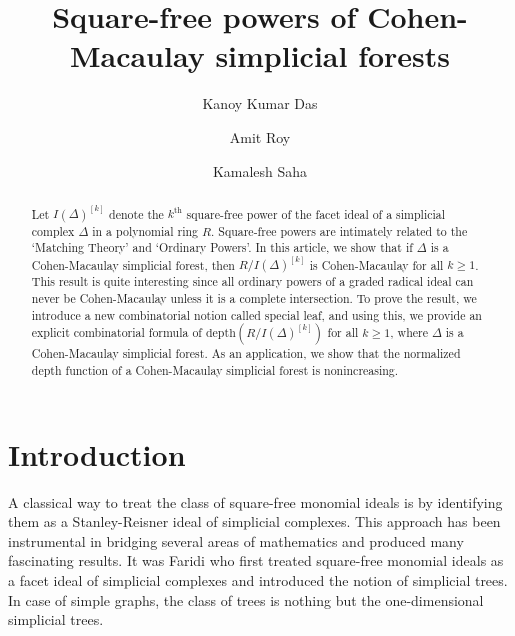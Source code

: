 \documentclass[12pt,a4paper,reqno]{amsart}
\theoremstyle{definition}
\def\D{\Delta}
\def\d{\mathrm{depth}}
\begin{document}
\title{Square-free powers of Cohen-Macaulay simplicial forests}

\author{Kanoy Kumar Das}
\address{Chennai Mathematical Institute, India}

\author{Amit Roy}
\address{Chennai Mathematical Institute, India}

\author{Kamalesh Saha}
\address{Department of Mathematics, SRM University-AP, Amaravati 522240, Andhra Pradesh, India}


\vspace*{-0.4cm}

\begin{abstract}
     Let $I(\D)^{[k]}$ denote the $k^{\text{th}}$ square-free power of the facet ideal of a simplicial complex $\D$ in a polynomial ring $R$. Square-free powers are intimately related to the `Matching Theory' and `Ordinary Powers'. In this article, we show that if $\D$ is a Cohen-Macaulay simplicial forest, then $R/I(\D)^{[k]}$ is Cohen-Macaulay for all $k\ge 1$. This result is quite interesting since all ordinary powers of a graded radical ideal can never be Cohen-Macaulay unless it is a complete intersection. To prove the result, we introduce a new combinatorial notion called special leaf, and using this, we provide an explicit combinatorial formula of $\d(R/I(\D)^{[k]})$ for all $k\ge 1$, where $\D$ is a Cohen-Macaulay simplicial forest. As an application, we show that the normalized depth function of a Cohen-Macaulay simplicial forest is nonincreasing. 
\end{abstract}


\maketitle
\section{Introduction}

A classical way to treat the class of square-free monomial ideals is by identifying them as a Stanley-Reisner ideal of simplicial complexes. This approach has been instrumental in bridging several areas of mathematics and produced many fascinating results. It was Faridi \cite{Faridi2002} who first treated square-free monomial ideals as a facet ideal of simplicial complexes and introduced the notion of simplicial trees. In case of simple graphs, the class of trees is nothing but the one-dimensional simplicial trees. 
\end{document}
